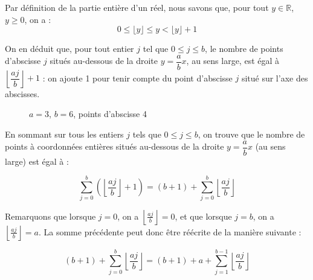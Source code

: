 \documentclass[11pt,a4paper]{article}
\begin{document}
Par définition de la partie entière d'un réel, nous savons que, pour tout $y\in\mathbb{R}$, $y\geqslant 0$, on a :
\[0 \leqslant \lfloor y \rfloor \leqslant y < \lfloor y \rfloor + 1\]

On en déduit que, pour tout entier $j$ tel que $0 \leqslant j \leqslant b$, le nombre de points d'abscisse $j$ situés au-dessous de la droite \(y = \dfrac{a}{b}x\), au sens large, est égal à \(\left\lfloor \dfrac{aj}{b} \right\rfloor + 1\) : on ajoute 1 pour tenir compte du point d'abscisse $j$ situé sur l'axe des abscisses.

\begin{figure}[h]
  \centering
{}
\caption{$a=3$, $b=6$, points d'abscisse 4}
\end{figure}

En sommant sur tous les entiers $j$ tels que $0 \leqslant j \leqslant b$, on trouve que le nombre de points à coordonnées entières situés au-dessous de la droite \(y = \dfrac{a}{b}x\) (au sens large) est égal à :

\[\sum _{j=0}^{b} \left( \left\lfloor \frac{aj}{b} \right\rfloor + 1 \right) = (b+1) + \sum _{j=0}^{b} \left\lfloor \frac{aj}{b} \right\rfloor\]

Remarquons que lorsque $j=0$, on a $\left\lfloor \frac{aj}{b} \right\rfloor = 0$, et que lorsque $j=b$, on a $\left\lfloor \frac{aj}{b} \right\rfloor = a$. La somme précédente peut donc être réécrite de la manière suivante :

\[(b+1) + \sum _{j=0}^{b} \left\lfloor \frac{aj}{b} \right\rfloor = (b+1) + a + \sum _{j=1}^{b-1} \left\lfloor \frac{aj}{b} \right\rfloor\]
\end{document}

